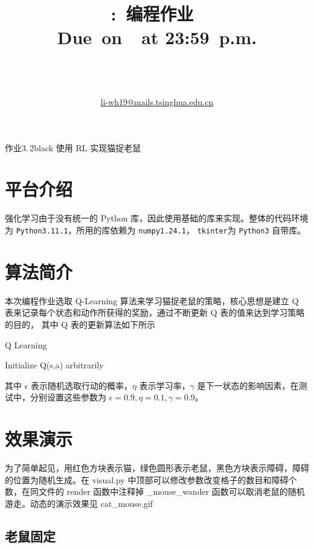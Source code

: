 \documentclass[UTF8, fontset=windows]{ctexart}
\title{
    \textmd{\Huge \hwzs \hmwkClass:\ 编程作业\ \textbf{\hmwkNum}}\\
    \large\vspace{0.2in}\normalsize{Due\ on\ \hmwkDueDate\ at 23:59\ p.m.}\\
    \vspace{0.1in}\large{\textit{\hmwkClassInstructor\ \hmwkClassTime}}
}
\author{\hwzs{\hmwkAuthorName \quad 无92\quad 2019011612}\\
        \href{mailto:li-wh19@mails.tsinghua.edu.cn}{li-wh19@mails.tsinghua.edu.cn}}
\date{}
\begin{document}
\maketitle
\thispagestyle{fancy}

\begin{mybox}[]{作业3.\,2}{black}
    使用 RL 实现猫捉老鼠
\end{mybox}

\section{平台介绍}

强化学习由于没有统一的 Python 库，因此使用基础的库来实现。整体的代码环境为 \texttt{Python3.11.1}，所用的库依赖为 \texttt{numpy1.24.1}，
\texttt{tkinter}为 \texttt{Python3} 自带库。

\section{算法简介}

本次编程作业选取 Q-Learning 算法来学习猫捉老鼠的策略，核心思想是建立 Q 表来记录每个状态和动作所获得的奖励，通过不断更新 Q 表的值来达到学习策略的目的，
其中 Q 表的更新算法如下所示

\begin{algorithm}
    \caption{Q Learning}
    \label{alg:1}
    Initialize Q(s,a) arbitrarily\;
\end{algorithm}

其中 $\epsilon$ 表示随机选取行动的概率，$\eta$ 表示学习率，$\gamma$ 是下一状态的影响因素，在测试中，分别设置这些参数为 $\epsilon = 0.9, \eta = 0.1, \gamma = 0.9$。

\section{效果演示}

为了简单起见，用红色方块表示猫，绿色圆形表示老鼠，黑色方块表示障碍，障碍的位置为随机生成。在 visual.py 中顶部可以修改参数改变格子的数目和障碍个数，在同文件的 render 函数中注释掉 \_mouse\_wander
函数可以取消老鼠的随机游走。动态的演示效果见 cat\_mouse.gif

\subsection{老鼠固定}
\end{document}
